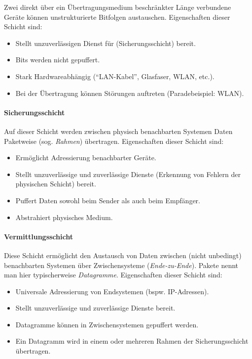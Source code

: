 \documentclass[a4paper, 14pt]{article}
\begin{document}
	Zwei direkt über ein Übertragungsmedium beschränkter Länge verbundene Geräte können unstrukturierte Bitfolgen austauschen.
	Eigenschaften dieser Schicht sind:

	\begin{itemize}
		\item Stellt unzuverlässigen Dienst für (Sicherungsschicht) bereit.
		\item Bits werden nicht gepuffert.
		\item Stark Hardwareabhängig (\enquote{LAN-Kabel}, Glasfaser, WLAN, etc.).
		\item Bei der Übertragung können Störungen auftreten (Paradebeispiel: WLAN).
	\end{itemize}

	\paragraph{Sicherungsschicht}

	Auf dieser Schicht werden zwischen physisch benachbarten Systemen Daten Paketweise (sog. \emph{Rahmen}) übertragen.
	Eigenschaften dieser Schicht sind:

	\begin{itemize}
		\item Ermöglicht Adressierung benachbarter Geräte.
		\item Stellt unzuverlässige und zuverlässige Dienste (Erkennung von Fehlern der physischen Schicht) bereit.
		\item Puffert Daten sowohl beim Sender als auch beim Empfänger.
		\item Abstrahiert physisches Medium.
	\end{itemize}

	\paragraph{Vermittlungsschicht}

	Diese Schicht ermöglicht den Austausch von Daten zwischen (nicht unbedingt) benachbarten Systemen über Zwischensysteme (\emph{Ende-zu-Ende}).
	Pakete nennt man hier typischerweise \emph{Datagramme}.
	Eigenschaften dieser Schicht sind:

	\begin{itemize}
		\item Universale Adressierung von Endsystemen (bspw. IP-Adressen).
		\item Stellt unzuverlässige und zuverlässige Dienste bereit.
		\item Datagramme können in Zwischensystemen gepuffert werden.
		\item Ein Datagramm wird in einem oder mehreren Rahmen der Sicherungsschicht übertragen.
	\end{itemize}
\end{document}
